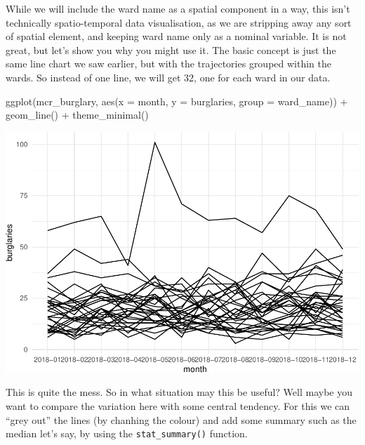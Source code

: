 \documentclass[
]{book}
\makeatletter
\newenvironment{Shaded}{\begin{snugshade}}{\end{snugshade}}
\newcommand{\AttributeTok}[1]{\textcolor[rgb]{0.61,0.61,0.61}{#1}}
\newcommand{\FunctionTok}[1]{\textcolor[rgb]{0,0,0}{#1}}
\newcommand{\NormalTok}[1]{#1}
\newcommand{\SpecialCharTok}[1]{\textcolor[rgb]{0,0,0}{#1}}
\newenvironment{kframe}{%
\medskip{}
\setlength{\fboxsep}{.8em}
 \def\at@end@of@kframe{}%
 \ifinner\ifhmode%
  \def\at@end@of@kframe{\end{minipage}}%
  \begin{minipage}{\columnwidth}%
 \fi\fi%
 \def\FrameCommand##1{\hskip\@totalleftmargin \hskip-\fboxsep
 \colorbox{shadecolor}{##1}\hskip-\fboxsep
     \hskip-\linewidth \hskip-\@totalleftmargin \hskip\columnwidth}%
 \MakeFramed {\advance\hsize-\width
   \@totalleftmargin\z@ \linewidth\hsize
   \@setminipage}}%
 {\par\unskip\endMakeFramed%
 \at@end@of@kframe}
\renewenvironment{Shaded}{\begin{kframe}}{\end{kframe}}
\makeatother
\begin{document}
While we will include the ward name as a spatial component in a way, this isn't technically spatio-temporal data visualisation, as we are stripping away any sort of spatial element, and keeping ward name only as a nominal variable. It is not great, but let's show you why you might use it. The basic concept is just the same line chart we saw earlier, but with the trajectories grouped within the wards. So instead of one line, we will get 32, one for each ward in our data.

\begin{Shaded}
\begin{Highlighting}[]
\FunctionTok{ggplot}\NormalTok{(mcr\_burglary, }
       \FunctionTok{aes}\NormalTok{(}\AttributeTok{x =}\NormalTok{ month, }
           \AttributeTok{y =}\NormalTok{ burglaries, }
           \AttributeTok{group =}\NormalTok{ ward\_name)) }\SpecialCharTok{+} 
  \FunctionTok{geom\_line}\NormalTok{() }\SpecialCharTok{+} 
  \FunctionTok{theme\_minimal}\NormalTok{()}
\end{Highlighting}
\end{Shaded}

\includegraphics{crime_mapping_files/figure-latex/unnamed-chunk-181-1.pdf}

This is quite the mess. So in what situation may this be useful? Well maybe you want to compare the variation here with some central tendency. For this we can ``grey out'' the lines (by chanhing the colour) and add some summary such as the median let's say, by using the \texttt{stat\_summary()} function.
\end{document}

